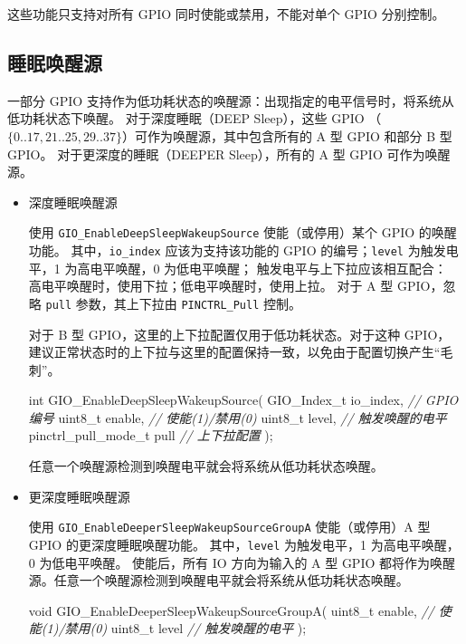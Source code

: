 \documentclass[
  12pt,
]{book}
\makeatletter
\newenvironment{Shaded}{\begin{snugshade}}{\end{snugshade}}
\newcommand{\CommentTok}[1]{\textcolor[rgb]{0.56,0.35,0.01}{\textit{#1}}}
\newcommand{\DataTypeTok}[1]{\textcolor[rgb]{0.13,0.29,0.53}{#1}}
\newcommand{\NormalTok}[1]{#1}
\newenvironment{kframe}{%
\medskip{}
\setlength{\fboxsep}{.8em}
 \def\at@end@of@kframe{}%
 \ifinner\ifhmode%
  \def\at@end@of@kframe{\end{minipage}}%
  \begin{minipage}{\columnwidth}%
 \fi\fi%
 \def\FrameCommand##1{\hskip\@totalleftmargin \hskip-\fboxsep
 \colorbox{shadecolor}{##1}\hskip-\fboxsep
     \hskip-\linewidth \hskip-\@totalleftmargin \hskip\columnwidth}%
 \MakeFramed {\advance\hsize-\width
   \@totalleftmargin\z@ \linewidth\hsize
   \@setminipage}}%
 {\par\unskip\endMakeFramed%
 \at@end@of@kframe}
\newenvironment{rmdblock}[1]
  {
  \begin{itemize}
  \renewcommand{\labelitemi}{
    \raisebox{-.7\height}[0pt][0pt]{
      {\setkeys{Gin}{width=3em,keepaspectratio}\texttt{[image: images/\#1]}}
    }
  }
  \setlength{\fboxsep}{1em}
  \begin{kframe}
  \item
  }
  {
  \end{kframe}
  \end{itemize}
  }
\newenvironment{rmdnote}
  {\begin{rmdblock}{note}}
  {\end{rmdblock}}
\makeatother
\begin{document}
\begin{rmdnote}
这些功能只支持对所有 GPIO 同时使能或禁用，不能对单个 GPIO 分别控制。
\end{rmdnote}

\hypertarget{ux7761ux7720ux5524ux9192ux6e90}{%
\subsection{睡眠唤醒源}\label{ux7761ux7720ux5524ux9192ux6e90}}

一部分 GPIO 支持作为低功耗状态的唤醒源：出现指定的电平信号时，将系统从低功耗状态下唤醒。
对于深度睡眠（DEEP Sleep），这些 GPIO （\(\{0..17, 21..25, 29..37\}\)）可作为唤醒源，其中包含所有的 A 型 GPIO 和部分 B 型 GPIO。
对于更深度的睡眠（DEEPER Sleep），所有的 A 型 GPIO 可作为唤醒源。

\begin{itemize}
\item
  深度睡眠唤醒源

  使用 \texttt{GIO\_EnableDeepSleepWakeupSource} 使能（或停用）某个 GPIO 的唤醒功能。
  其中，\texttt{io\_index} 应该为支持该功能的 GPIO 的编号；\texttt{level} 为触发电平，1 为高电平唤醒，0 为低电平唤醒；
  触发电平与上下拉应该相互配合：
  高电平唤醒时，使用下拉；低电平唤醒时，使用上拉。
  对于 A 型 GPIO，忽略 \texttt{pull} 参数，其上下拉由 \texttt{PINCTRL\_Pull} 控制。

  对于 B 型 GPIO，这里的上下拉配置仅用于低功耗状态。对于这种 GPIO，
  建议正常状态时的上下拉与这里的配置保持一致，以免由于配置切换产生``毛刺''。

\begin{Shaded}
\begin{Highlighting}[]
\DataTypeTok{int}\NormalTok{ GIO_EnableDeepSleepWakeupSource(}
\NormalTok{  GIO_Index_t io_index,     }\CommentTok{// GPIO 编号}
  \DataTypeTok{uint8_t}\NormalTok{ enable,           }\CommentTok{// 使能(1)/禁用(0)}
  \DataTypeTok{uint8_t}\NormalTok{ level,            }\CommentTok{// 触发唤醒的电平}
\NormalTok{  pinctrl_pull_mode_t pull  }\CommentTok{// 上下拉配置}
\NormalTok{);}
\end{Highlighting}
\end{Shaded}

  任意一个唤醒源检测到唤醒电平就会将系统从低功耗状态唤醒。
\item
  更深度睡眠唤醒源

  使用 \texttt{GIO\_EnableDeeperSleepWakeupSourceGroupA} 使能（或停用）A 型 GPIO 的更深度睡眠唤醒功能。
  其中，\texttt{level} 为触发电平，1 为高电平唤醒，0 为低电平唤醒。
  使能后，所有 IO 方向为输入的 A 型 GPIO 都将作为唤醒源。任意一个唤醒源检测到唤醒电平就会将系统从低功耗状态唤醒。

\begin{Shaded}
\begin{Highlighting}[]
\DataTypeTok{void}\NormalTok{ GIO_EnableDeeperSleepWakeupSourceGroupA(}
  \DataTypeTok{uint8_t}\NormalTok{ enable,           }\CommentTok{// 使能(1)/禁用(0)}
  \DataTypeTok{uint8_t}\NormalTok{ level             }\CommentTok{// 触发唤醒的电平}
\NormalTok{);}
\end{Highlighting}
\end{Shaded}
\end{itemize}
\end{document}
